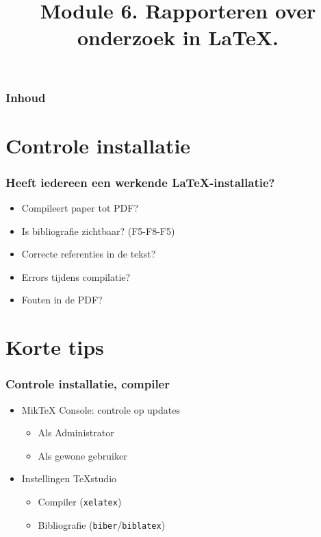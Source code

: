\documentclass[aspectratio=169]{beamer}
\title{Module 6. Rapporteren over onderzoek in \LaTeX{}.}
\subtitle{\coursename}
\author{\lecturers}   %
\date{\academicyear}
\begin{document}
\begin{frame}
  \maketitle
\end{frame}

\begin{frame}
  \frametitle{Inhoud}

  \tableofcontents
\end{frame}

\section{Controle installatie}

\begin{frame}
  \frametitle{Heeft iedereen een werkende {\LaTeX}-installatie?}

  \begin{itemize}
    \item Compileert paper tot PDF?
    \item Is bibliografie zichtbaar? (F5-F8-F5)
    \item Correcte referenties in de tekst?
    \item Errors tijdens compilatie?
    \item Fouten in de PDF?
  \end{itemize}

\end{frame}

\section{Korte tips}


\begin{frame}
  \frametitle{Controle installatie, compiler}

  \begin{itemize}
    \item Mik{\TeX} Console: controle op updates
          \begin{itemize}
            \item Als Administrator
            \item Als gewone gebruiker
          \end{itemize}
    \item Instellingen TeXstudio
          \begin{itemize}
            \item Compiler (\texttt{xelatex})
            \item Bibliografie (\texttt{biber}/\texttt{biblatex})
          \end{itemize}
  \end{itemize}

\end{frame}
\end{document}
